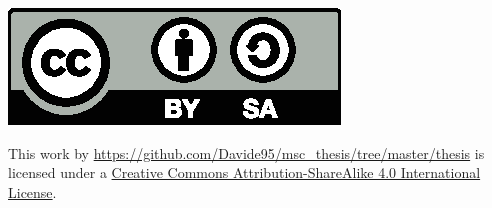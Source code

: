 \clearpage
\begin{center}
    \includegraphics{images/cc.eps}

    This work by \url{https://github.com/Davide95/msc_thesis/tree/master/thesis} is licensed under a \linebreak
    \href{https://creativecommons.org/licenses/by-sa/4.0/}{Creative Commons Attribution-ShareAlike 4.0 International License}.
\end{center}